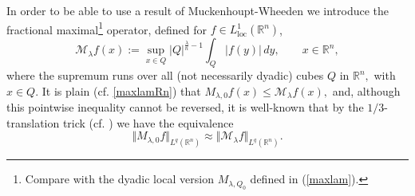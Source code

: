 \documentclass[11pt, a4paper,leqno]{amsart}
\theoremstyle{plain}
\numberwithin{equation}{section}
\theoremstyle{definition}
\theoremstyle{remark}
\begin{document}


In order to be able to use a result of Muckenhoupt-Wheeden \cite{MW74} we
introduce the fractional maximal\footnote{Compare with the dyadic local version $M_{\lambda,Q_0}$ defined in (\ref{maxlam}).} operator, defined for $f\in L_{\text{loc}}%
^{1}(\mathbb{R}^{n})$,%
\begin{equation*}
\mathcal{M}_{\lambda}f(x):=\sup_{x\in Q}|Q|^{\frac{\lambda}{n}-1}\int%
_{Q}|f(y)|\,dy,\qquad x\in\mathbb{R}^{n},
\end{equation*}
where the supremum runs over all (not necessarily dyadic) cubes $Q$ in
$\mathbb{R}^{n},$ with $x\in Q$. It is plain (cf. \eqref{maxlamRn}) that
$M_{\lambda,0}f(x)\leq\mathcal{M}_{\lambda}f(x),$ and, although this pointwise
inequality cannot be reversed, it is well-known that by the $1/3$-translation
trick (cf. \cite{Ch88}) we have the equivalence%
\begin{equation}
\Vert M_{\lambda,0}f\Vert_{L^{q}(\mathbb{R}^{n})}\approx\Vert\mathcal{M}%
_{\lambda}f\Vert_{L^{q}(\mathbb{R}^{n})}.\label{vale}%
\end{equation}
\end{document}
